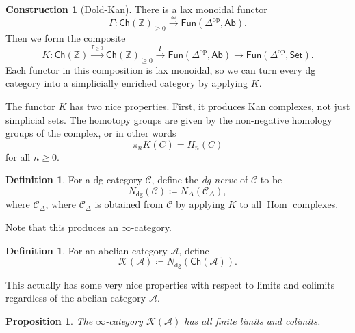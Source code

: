 \documentclass[10pt]{amsart}
\newtheorem{prop}[thm]{Proposition}
\theoremstyle{definition}
\newtheorem{defn}[thm]{Definition}
\newtheorem{con}[thm]{Construction}
\theoremstyle{remark}
\theoremstyle{plain}
\theoremstyle{definition}
\theoremstyle{remark}
\newcommand{\Z}{\mathbb{Z}}
\newcommand{\mc}[1]{\mathcal{#1}}
\newcommand{\ms}[1]{\mathsf{#1}}
\newcommand{\1}{\mathbf{1}}
\newcommand{\2}{\mathbf{2}}
\newcommand{\3}{\mathbf{3}}
\DeclareMathOperator{\Hom}{Hom}
\DeclareMathOperator{\op}{op}
\begin{document}
\begin{con}[Dold-Kan]
    There is a lax monoidal functor
    \[ \Gamma \colon \ms{Ch}(\Z)_{\geq 0} \xrightarrow{\simeq} \ms{Fun}(\Delta^{\op}, \ms{Ab}). \]
    Then we form the composite
    \[ K \colon \ms{Ch}(\Z) \xrightarrow{\tau_{\geq 0}} \ms{Ch}(\Z)_{\geq 0} \xrightarrow{\Gamma} \ms{Fun}(\Delta^{\op}, \ms{Ab}) \to \ms{Fun}(\Delta^{\op}, \ms{Set}). \]
    Each functor in this composition is lax monoidal, so we can turn every dg category into a simplicially enriched category by applying $K$.
\end{con}

The functor $K$ has two nice properties. First, it produces Kan complexes, not just simplicial sets. The homotopy groups are given by the non-negative homology groups of the complex, or in other words
\[ \pi_n K(C) = H_n(C) \]
for all $n \geq 0$.

\begin{defn}
    For a dg category $\mc{C}$, define the \textit{dg-nerve} of $\mc{C}$ to be
    \[ N_{\ms{dg}}(\mc{C}) \coloneqq N_{\Delta} (\mc{C}_{\Delta}), \]
    where $\mc{C}_{\Delta}$, where $\mc{C}_{\Delta}$ is obtained from $\mc{C}$ by applying $K$ to all $\Hom$ complexes.
\end{defn}
Note that this produces an $\infty$-category.

\begin{defn}
    For an abelian category $\mc{A}$, define
    \[ \mc{K}(\mc{A}) \coloneqq N_{\ms{dg}}(\ms{Ch}(\mc{A})). \]
\end{defn}

This actually has some very nice properties with respect to limits and colimits regardless of the abelian category $\mc{A}$.

\begin{prop}
    The $\infty$-category $\mc{K}(\mc{A})$ has all finite limits and colimits.
\end{prop}
\end{document}
